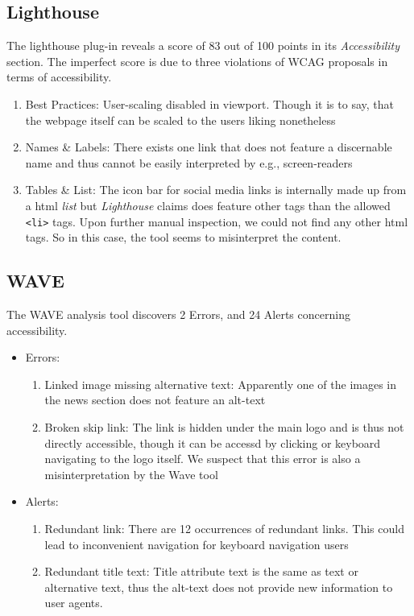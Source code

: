 \subsection*{Lighthouse}
The lighthouse plug-in reveals a score of 83 out of 100 points in its \textsl{Accessibility} section. The imperfect score is due to three violations of WCAG proposals in terms of accessibility.
\begin{enumerate}
	\item Best Practices: User-scaling disabled in viewport. Though it is to say, that the webpage itself can be scaled to the users liking nonetheless
	\item Names \& Labels: There exists one link that does not feature a discernable name and thus cannot be easily interpreted by e.g., screen-readers
	\item Tables \& List: The icon bar for social media links is internally made up from a html \textsl{list} but \textsl{Lighthouse} claims does feature other tags than the allowed \texttt{<li>} tags. Upon further manual inspection, we could not find any other html tags. So in this case, the tool seems to misinterpret the content.
\end{enumerate}
\subsection*{WAVE}
The WAVE analysis tool discovers 2 Errors, and 24 Alerts concerning accessibility.
\begin{itemize}
	\item Errors: 	\begin{enumerate}
						\item Linked image missing alternative text: Apparently one of the images in the news section does not feature an alt-text
						\item Broken skip link: The link is hidden under the main logo and is thus not directly accessible, though it can be accessd by clicking or keyboard navigating to the logo itself. We suspect that this error is also a misinterpretation by the Wave tool
					\end{enumerate}
	\item Alerts: 	\begin{enumerate}
						\item Redundant link: There are 12 occurrences of redundant links. This could lead to inconvenient navigation for keyboard navigation users
						\item Redundant title text: Title attribute text is the same as text or alternative text, thus the alt-text does not provide new information to user agents.
					\end{enumerate}
\end{itemize}
